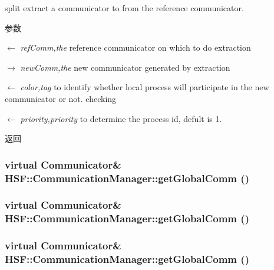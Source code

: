 split extract a communicator to from the reference communicator. 
\begin{DoxyParams}{参数}
\item[\mbox{$\leftarrow$} {\em refComm,the}]reference communicator on which to do extraction \item[\mbox{$\rightarrow$} {\em newComm,the}]new communicator generated by extraction \item[\mbox{$\leftarrow$} {\em color,tag}]to identify whether local process will participate in the new communicator or not. checking \item[\mbox{$\leftarrow$} {\em priority,priority}]to determine the process id, defult is 1. \end{DoxyParams}
\begin{DoxyReturn}{返回}

\end{DoxyReturn}
\hypertarget{classHSF_1_1CommunicationManager_ac71fa06c7568af39df109ffa32a5c444}{
\subsubsection[{getGlobalComm}]{\setlength{\rightskip}{0pt plus 5cm}virtual {\bf Communicator}\& HSF::CommunicationManager::getGlobalComm ()}}
\label{classHSF_1_1CommunicationManager_ac71fa06c7568af39df109ffa32a5c444}
\hypertarget{classHSF_1_1CommunicationManager_ac71fa06c7568af39df109ffa32a5c444}{
\subsubsection[{getGlobalComm}]{\setlength{\rightskip}{0pt plus 5cm}virtual {\bf Communicator}\& HSF::CommunicationManager::getGlobalComm ()}}
\label{classHSF_1_1CommunicationManager_ac71fa06c7568af39df109ffa32a5c444}
\hypertarget{classHSF_1_1CommunicationManager_ac71fa06c7568af39df109ffa32a5c444}{
\subsubsection[{getGlobalComm}]{\setlength{\rightskip}{0pt plus 5cm}virtual {\bf Communicator}\& HSF::CommunicationManager::getGlobalComm ()}}
